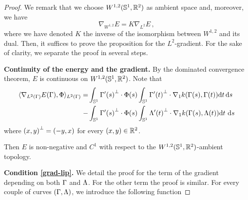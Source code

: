 \begin{proof}
We remark that we choose $W^{1,2}(\mathbb{S}^1,\mathbb{R}^2)$ as ambient space and, moreover, we have 
\begin{equation}\label{grad-sob}
\nabla_{W^{1,2}} E = K \nabla_{L^2} E\,,
\end{equation}
where we have denoted $K$ the inverse of the isomorphism between $W^{1,2}$ and its dual. Then, it suffices to prove the proposition for the $L^2 $-gradient. For the sake of clarity, we separate the proof in several steps.

{\bf Continuity of the energy and the gradient.} 
By the dominated convergence theorem,  $E$ is continuous on  $W^{1,2}(\mathbb{S}^1,{\mathbb R}^2)$.
Note that
\begin{align*}
	 \langle \nabla_{L^2(\Gamma)} E(\Gamma), \Phi\rangle_{L^2(\Gamma)} = &\int_{\mathbb{S}^1}  {\Gamma'(s)}^\bot \cdot \Phi(s) \int_{\mathbb{S}^1}  {\Gamma'(t)}^\bot \cdot \nabla_1 k(\Gamma(s),\Gamma(t)) \mathrm{d} t\, \mathrm{d} s\\
	  - &\int_{\mathbb{S}^1} {\Gamma'(s)}^\bot \cdot \Phi(s) \int_{\mathbb{S}^1}  {\Lambda'(t)}^\bot \cdot \nabla_1 k(\Gamma(s),\Lambda(t)) \mathrm{d} t\,  \,\mathrm{d} s
\end{align*}
where ${(x,y)}^\bot=(-y,x)$ for every $(x,y)\in \mathbb{R}^2$. 


Then $E$ is  non-negative  and $C^1$ with respect to the $W^{1,2}(\mathbb{S}^1, \mathbb{R}^2)$-ambient topology.\vspace{0.2cm} 

{\bf Condition \eqref{grad-lip}.} 
We detail the proof for the term of the gradient depending on both $\Gamma$ and $\Lambda$. For the other term the proof is similar. For every couple of curves $(\Gamma,\Lambda)$, we introduce the following function


\end{proof}
